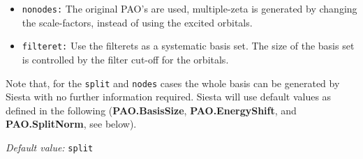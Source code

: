 \documentclass[11pt]{article}
\begin{document}
\begin{description}
\begin{itemize}
\item {\tt nonodes:}
The original PAO's are used, multiple-zeta is generated
by changing the scale-factors, instead of using the excited orbitals.

\item {\tt filteret:} Use the filterets as a systematic basis set.
The size of the basis set is controlled by the filter cut-off for
the orbitals.

\end{itemize}

\noindent
Note that, for the {\tt split} and {\tt nodes} cases
the whole basis can be generated by {\sc Siesta} with no further information
required. {\sc Siesta} will use default values as defined in the following
({\bf PAO.BasisSize},
{\bf PAO.EnergyShift}, and {\bf PAO.SplitNorm}, see below).

{\it Default value:} {\tt split}

\end{description}
\end{document}
